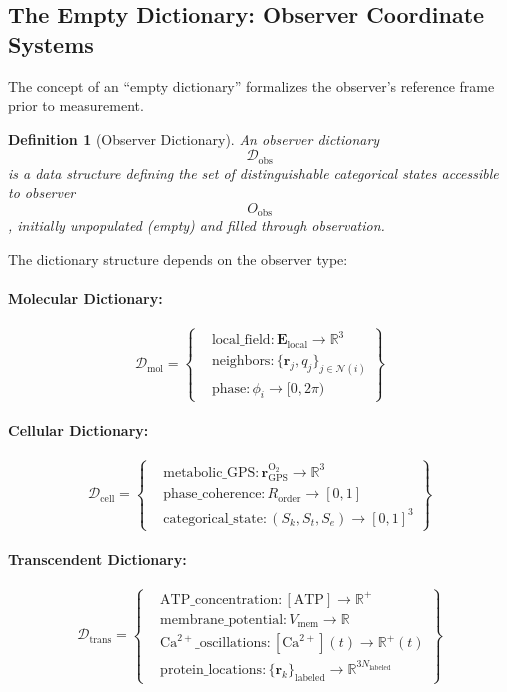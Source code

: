 \documentclass[11pt,twocolumn,a4paper]{article}
\newtheorem{definition}[theorem]{Definition}
\theoremstyle{remark}
\begin{document}
\subsection{The Empty Dictionary: Observer Coordinate Systems}

The concept of an ``empty dictionary'' formalizes the observer's reference frame prior to measurement.

\begin{definition}[Observer Dictionary]
\label{def:observer_dictionary}
An observer dictionary $$\mathcal{D}_{\mathrm{obs}}$$ is a data structure defining the set of distinguishable categorical states accessible to observer $$O_{\mathrm{obs}}$$, initially unpopulated (empty) and filled through observation.
\end{definition}

The dictionary structure depends on the observer type:

\paragraph{Molecular Dictionary:}
$$
\mathcal{D}_{\mathrm{mol}} = \left\{
\begin{aligned}
&\text{local\_field}: \mathbf{E}_{\mathrm{local}} \to \mathbb{R}^3 \\
&\text{neighbors}: \{\mathbf{r}_j, q_j\}_{j \in \mathcal{N}(i)} \\
&\text{phase}: \phi_i \to [0, 2\pi)
\end{aligned}
\right\}
$$

\paragraph{Cellular Dictionary:}
$$
\mathcal{D}_{\mathrm{cell}} = \left\{
\begin{aligned}
&\text{metabolic\_GPS}: \mathbf{r}_{\mathrm{GPS}}^{\mathrm{O}_2} \to \mathbb{R}^3 \\
&\text{phase\_coherence}: R_{\mathrm{order}} \to [0, 1] \\
&\text{categorical\_state}: (S_k, S_t, S_e) \to [0,1]^3
\end{aligned}
\right\}
$$

\paragraph{Transcendent Dictionary:}
$$
\mathcal{D}_{\mathrm{trans}} = \left\{
\begin{aligned}
&\text{ATP\_concentration}: [\text{ATP}] \to \mathbb{R}^+ \\
&\text{membrane\_potential}: V_{\mathrm{mem}} \to \mathbb{R} \\
&\text{Ca}^{2+}\text{\_oscillations}: [\text{Ca}^{2+}](t) \to \mathbb{R}^+(t) \\
&\text{protein\_locations}: \{\mathbf{r}_k\}_{\mathrm{labeled}} \to \mathbb{R}^{3N_{\mathrm{labeled}}}
\end{aligned}
\right\}
$$
\end{document}
